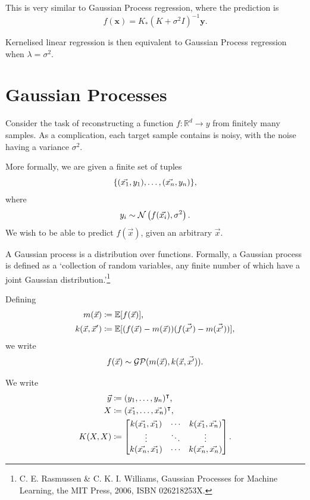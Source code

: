 \documentclass[11pt,twoside]{report}
\newcommand\bx{\mathbf{x}}
\newcommand\by{\mathbf{y}}
\newcommand\bbE{\mathbb{E}}
\newcommand\bbR{\mathbb{R}}
\newcommand\cG{\mathcal{G}}
\newcommand\cN{\mathcal{N}}
\newcommand\cP{\mathcal{P}}
\begin{document}
This is very similar to Gaussian Process regression, where the prediction is \[
    f(\bx) = K_*\left(K + \sigma^2 I\right)^{-1}\by \text{.}
\]

Kernelised linear regression is then equivalent to Gaussian Process regression when $\lambda = \sigma^2$.



\section{Gaussian Processes}
Consider the task of reconstructing a function $f: \bbR^d \to y$ from finitely many samples. As a complication, each target sample contains is noisy, with the noise having a variance $\sigma^2$.

More formally, we are given a finite set of tuples\[
    \{ (\vec{x_1}, y_1), \dots, (\vec{x_n}, y_n) \}\text,
\] where \[
    y_i \sim \cN\left(f(\vec{x_i}), \sigma^2\right)\text.
\] We wish to be able to predict $f(\vec{x})$, given an arbitrary $\vec{x}$.

A Gaussian process is a distribution over functions. Formally, a Gaussian process is defined as a `collection of random variables, any finite number of which have a joint Gaussian distribution.'\footnote{C. E. Rasmussen \& C. K. I. Williams, Gaussian Processes for Machine Learning, the MIT Press, 2006, ISBN 026218253X.}

Defining \begin{align*}
    m(\vec{x}) &\coloneqq \bbE[f(\vec{x})] \text, \\
    k(\vec{x}, \vec{x}') &\coloneqq \bbE[(f(\vec{x}) - m(\vec{x}))(f(\vec{x'}) - m(\vec{x'}))],
\end{align*} we write \[
    f(\vec{x}) \sim \cG\cP(m(\vec{x}), k(\vec{x}, \vec{x'}))\text.
\]

We write \begin{align*}
    \vec y &\coloneqq (y_1, \dots, y_n)^\intercal \text, \\
    X &\coloneqq (\vec{x_1}, \dots, \vec{x_n})^\intercal \text, \\
    K(X, X) &\coloneqq \begin{bmatrix}
        k(\vec{x_1}, \vec{x_1}) & \cdots & k(\vec{x_1}, \vec{x_n}) \\
        \vdots & \ddots & \vdots \\
        k(\vec{x_n}, \vec{x_1}) & \cdots & k(\vec{x_n}, \vec{x_n})
    \end{bmatrix}\text.
\end{align*}
\end{document}
